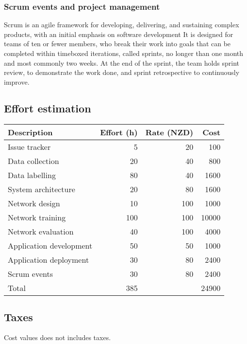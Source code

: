 \documentclass{article}
\begin{document}
\subsubsection{Scrum events and project management}
\label{sec:org67a124e}
Scrum is an agile framework for developing, delivering, and sustaining complex products, with an initial emphasis on software development
It is designed for teams of ten or fewer members, who break their work into goals that can be completed within timeboxed iterations, called sprints, no longer than one month and most commonly two weeks.
At the end of the sprint, the team holds sprint review, to demonstrate the work done, and sprint retrospective to continuously improve.

\subsection{Effort estimation}
\label{sec:orgdfb3b64}

\begin{center}
\begin{tabular}{lrrr}
Description & Effort (h) & Rate (NZD) & Cost\\
\hline
Issue tracker & 5 & 20 & 100\\
Data collection & 20 & 40 & 800\\
Data labelling & 80 & 40 & 1600\\
System architecture & 20 & 80 & 1600\\
Network design & 10 & 100 & 1000\\
Network training & 100 & 100 & 10000\\
Network evaluation & 40 & 100 & 4000\\
Application development & 50 & 50 & 1000\\
Application deployment & 30 & 80 & 2400\\
Scrum events & 30 & 80 & 2400\\
\hline
Total & 385 &  & 24900\\
\end{tabular}
\end{center}

\subsection{Taxes}
\label{sec:org54abf36}
Cost values does not includes taxes.
\end{document}
